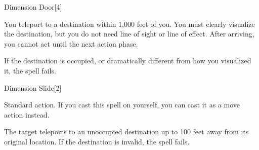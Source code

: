 \begin{spellsection}{Dimension Door}[4]
    \begin{spellheader}
    \end{spellheader}
    \begin{spellcontent}
        \begin{spelltargetinginfo}
        \end{spelltargetinginfo}
        \begin{spelleffects}
            \spelleffect You teleport to a destination within 1,000 feet of you. You must clearly visualize the destination, but you do not need line of sight or line of effect. After arriving, you cannot act until the next action phase.

            If the destination is occupied, or dramatically different from how you visualized it, the spell fails.
        \end{spelleffects}
    \end{spellcontent}
    \begin{spellfooter}
        \miscastexplode
    \end{spellfooter}
    \begin{spellaugments}
    \end{spellaugments}
\end{spellsection}

\begin{spellsection}{Dimension Slide}[2]
    \begin{spellheader}
    \end{spellheader}
    \begin{spellcontent}
        \begin{spelltargetinginfo}
            \spelltime Standard action. If you cast this spell on yourself, you can cast it as a move action instead.
        \end{spelltargetinginfo}
        \begin{spelleffects}
            \spelleffect The target teleports to an unoccupied destination up to 100 feet away from its original location. If the destination is invalid, the spell fails.
        \end{spelleffects}
    \end{spellcontent}
    \begin{spellfooter}
        \miscastrandom
    \end{spellfooter}
    \begin{spellaugments}
    \end{spellaugments}
\end{spellsection}

